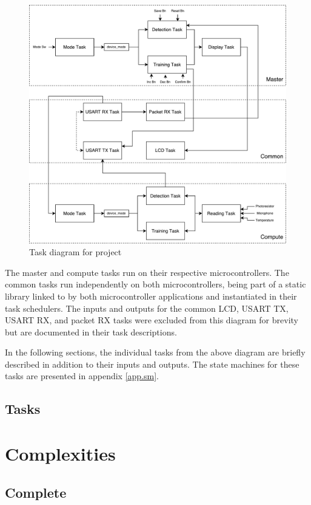 \documentclass{article}
\begin{document}
\begin{figure}[H]
  \centering
  \noindent\includegraphics[width = \textwidth]{task_diagram}
  \caption{Task diagram for project}
  \label{task:1}
\end{figure}

The master and compute tasks run on their respective microcontrollers.
The common tasks run independently on both microcontrollers, being part
of a static library linked to by both microcontroller applications and
instantiated in their task schedulers.  The inputs and outputs for the
common LCD, USART TX, USART RX, and packet RX tasks were excluded from
this diagram for brevity but are documented in their task descriptions.

In the following sections, the individual tasks from the above diagram
are briefly described in addition to their inputs and outputs.  The
state machines for these tasks are presented in appendix \ref{app.sm}.

\subsection{Tasks}

\section{Complexities}

\subsection{Complete}
\end{document}

